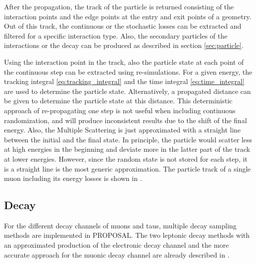 After the propagation, the track of the particle is returned consisting of the interaction points and the edge points at the entry and exit points of a geometry.
Out of this track, the continuous or the stochastic losses can be extracted and filtered for a specific interaction type.
Also, the secondary particles of the interactions or the decay can be produced as described in section \ref{sec:particle}.

Using the interaction point in the track, also the particle state at each point of the continuous step can be extracted using re-simulations.
For a given energy, the tracking integral \eqref{eq:tracking_integral} and the time integral \eqref{eq:time_integral} are used to determine the particle state.
Alternatively, a propagated distance can be given to determine the particle state at this distance.
This deterministic approach of re-propagating one step is not useful when including continuous randomization, and will produce inconsistent results due to the shift of the final energy.
Also, the Multiple Scattering is just approximated with a straight line between the initial and the final state.
In principle, the particle would scatter less at high energies in the beginning and deviate more in the latter part of the track at lower energies.
However, since the random state is not stored for each step, it is a straight line is the most generic approximation.
The particle track of a single muon including its energy losses is shown in .

%

\subsection{Decay}

For the different decay channels of muons and taus, multiple decay sampling methods are implemented in PROPOSAL.
The two leptonic decay methods with an approximated production of the electronic decay channel and the more accurate approach for the muonic decay channel are already described in .


